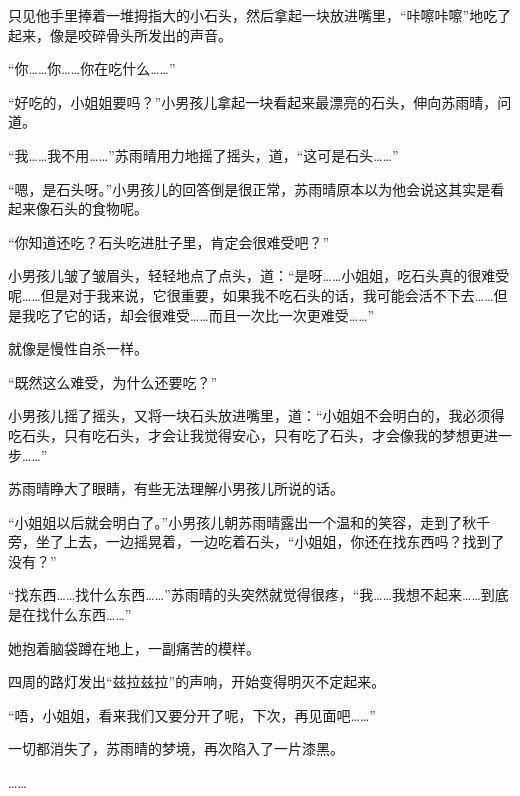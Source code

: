 只见他手里捧着一堆拇指大的小石头，然后拿起一块放进嘴里，“咔嚓咔嚓”地吃了起来，像是咬碎骨头所发出的声音。

“你……你……你在吃什么……”

“好吃的，小姐姐要吗？”小男孩儿拿起一块看起来最漂亮的石头，伸向苏雨晴，问道。

“我……我不用……”苏雨晴用力地摇了摇头，道，“这可是石头……”

“嗯，是石头呀。”小男孩儿的回答倒是很正常，苏雨晴原本以为他会说这其实是看起来像石头的食物呢。

“你知道还吃？石头吃进肚子里，肯定会很难受吧？”

小男孩儿皱了皱眉头，轻轻地点了点头，道：“是呀……小姐姐，吃石头真的很难受呢……但是对于我来说，它很重要，如果我不吃石头的话，我可能会活不下去……但是我吃了它的话，却会很难受……而且一次比一次更难受……”

就像是慢性自杀一样。

“既然这么难受，为什么还要吃？”

小男孩儿摇了摇头，又将一块石头放进嘴里，道：“小姐姐不会明白的，我必须得吃石头，只有吃石头，才会让我觉得安心，只有吃了石头，才会像我的梦想更进一步……”

苏雨晴睁大了眼睛，有些无法理解小男孩儿所说的话。

“小姐姐以后就会明白了。”小男孩儿朝苏雨晴露出一个温和的笑容，走到了秋千旁，坐了上去，一边摇晃着，一边吃着石头，“小姐姐，你还在找东西吗？找到了没有？”

“找东西……找什么东西……”苏雨晴的头突然就觉得很疼，“我……我想不起来……到底是在找什么东西……”

她抱着脑袋蹲在地上，一副痛苦的模样。

四周的路灯发出“兹拉兹拉”的声响，开始变得明灭不定起来。

“唔，小姐姐，看来我们又要分开了呢，下次，再见面吧……”

一切都消失了，苏雨晴的梦境，再次陷入了一片漆黑。

……

